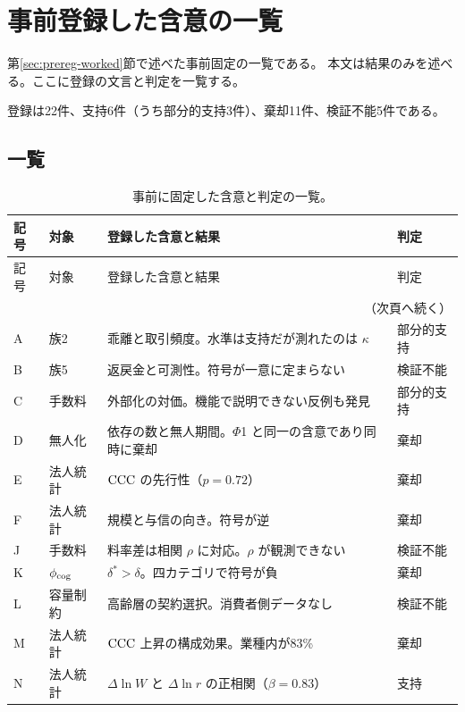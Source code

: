 \chapter{事前登録した含意の一覧}
\label{app:prereg}

第\ref{sec:prereg-worked}節で述べた事前固定の一覧である。
本文は結果のみを述べる。ここに登録の文言と判定を一覧する。

登録は22件、支持6件（うち部分的支持3件）、棄却11件、検証不能5件である。

\section{一覧}

\begin{longtable}{@{}ll>{\raggedright\arraybackslash}p{}l@{}}
\caption{事前に固定した含意と判定の一覧。}\label{tab:prereg-list}\\
\toprule
記号 & 対象 & 登録した含意と結果 & 判定 \\
\midrule
\endfirsthead
\toprule
記号 & 対象 & 登録した含意と結果 & 判定 \\
\midrule
\endhead
\midrule
\multicolumn{4}{r}{\footnotesize（次頁へ続く）}\\
\endfoot
\bottomrule
\endlastfoot
A & 族2 & 乖離と取引頻度。水準は支持だが測れたのは $\kappa$ & 部分的支持 \\
B & 族5 & 返戻金と可測性。符号が一意に定まらない & 検証不能 \\
C & 手数料 & 外部化の対価。機能で説明できない反例も発見 & 部分的支持 \\
D & 無人化 & 依存の数と無人期間。$\Phi$1 と同一の含意であり同時に棄却 & 棄却 \\
E & 法人統計 & $\mathrm{CCC}$ の先行性（$p=0.72$） & 棄却 \\
F & 法人統計 & 規模と与信の向き。符号が逆 & 棄却 \\
J & 手数料 & 料率差は相関 $\rho$ に対応。$\rho$ が観測できない & 検証不能 \\
K & $\phi_{\rm cog}$ & $\delta^\ast>\delta$。四カテゴリで符号が負 & 棄却 \\
L & 容量制約 & 高齢層の契約選択。消費者側データなし & 検証不能 \\
M & 法人統計 & $\mathrm{CCC}$ 上昇の構成効果。業種内が83\% & 棄却 \\
N & 法人統計 & $\Delta\ln W$ と $\Delta\ln r$ の正相関（$\beta=0.83$） & 支持 \\

\end{longtable}
